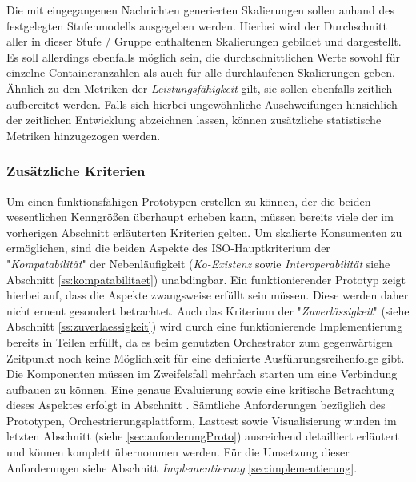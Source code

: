 
Die mit eingegangenen Nachrichten generierten Skalierungen sollen anhand des festgelegten Stufenmodells ausgegeben werden. Hierbei wird der Durchschnitt aller in dieser Stufe / Gruppe enthaltenen Skalierungen gebildet und dargestellt. Es soll allerdings ebenfalls möglich sein, die durchschnittlichen Werte sowohl für einzelne Containeranzahlen als auch für alle durchlaufenen Skalierungen geben. Ähnlich zu den Metriken der \emph{Leistungsfähigkeit} gilt, sie sollen ebenfalls zeitlich aufbereitet werden. Falls sich hierbei ungewöhnliche Auschweifungen hinsichlich der zeitlichen Entwicklung abzeichnen lassen, können zusätzliche statistische Metriken hinzugezogen werden. 


\subsubsection{Zusätzliche Kriterien \checkmark}
Um einen funktionsfähigen Prototypen erstellen zu können, der die beiden wesentlichen Kenngrößen überhaupt erheben kann, müssen bereits viele der im vorherigen Abschnitt erläuterten Kriterien gelten. Um skalierte Konsumenten zu ermöglichen, sind die beiden Aspekte des ISO-Hauptkriterium der "\emph{Kompatabilität}" der Nebenläufigkeit (\emph{Ko-Existenz} sowie \emph{Interoperabilität} siehe Abschnitt \ref{ss:kompatabilitaet}) unabdingbar. Ein funktionierender Prototyp zeigt hierbei auf, dass die Aspekte zwangsweise erfüllt sein müssen. Diese werden daher nicht erneut gesondert betrachtet. Auch das Kriterium der "\emph{Zuverlässigkeit}" (siehe Abschnitt \ref{ss:zuverlaessigkeit}) wird durch eine funktionierende Implementierung bereits in Teilen erfüllt, da es beim genutzten Orchestrator zum gegenwärtigen Zeitpunkt noch keine Möglichkeit für eine definierte Ausführungsreihenfolge gibt. Die Komponenten müssen im Zweifelsfall mehrfach starten um eine Verbindung aufbauen zu können. Eine genaue Evaluierung sowie eine kritische Betrachtung dieses Aspektes erfolgt in Abschnitt . Sämtliche Anforderungen bezüglich des Prototypen, Orchestrierungsplattform, Lasttest sowie Visualisierung wurden im letzten Abschnitt (siehe \ref{sec:anforderungProto}) ausreichend detailliert erläutert und können komplett übernommen werden. Für die Umsetzung dieser Anforderungen siehe Abschnitt \emph{Implementierung} \ref{sec:implementierung}.

